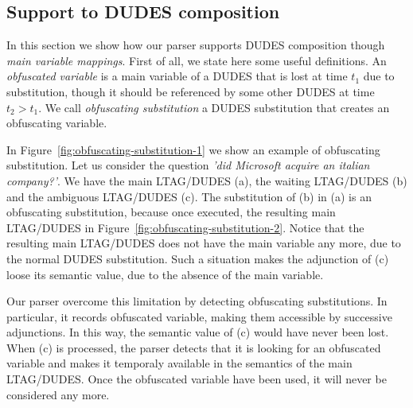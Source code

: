 \subsection{Support to DUDES composition}
\label{sec:parsing-support-dudes-composition}

In this section we show how our parser supports DUDES composition though \textit{main variable mappings}.
%
First of all, we state here some useful definitions.
%
An \textit{obfuscated variable} is a main variable of a DUDES that is lost at time $t_{1}$ due to substitution, though it should be referenced by some other DUDES at time $t_{2}>t_{1}$.
%
We call \textit{obfuscating substitution} a DUDES substitution that creates an obfuscating variable.

In Figure~\ref{fig:obfuscating-substitution-1} we show an example of obfuscating substitution. 
%
Let us consider the question \textit{'did Microsoft acquire an italian company?'}.
%
We have the main LTAG/DUDES (a), the waiting LTAG/DUDES (b) and the ambiguous LTAG/DUDES (c).
%
The substitution of (b) in (a) is an obfuscating substitution, because once executed, the resulting main LTAG/DUDES in Figure~\ref{fig:obfuscating-substitution-2}.
%
Notice that the resulting main LTAG/DUDES does not have the main variable any more, due to the normal DUDES substitution.
%
Such a situation makes the adjunction of (c) loose its semantic value, due to the absence of the main variable.

Our parser overcome this limitation by detecting obfuscating substitutions. 
%
In particular, it records obfuscated variable, making them accessible by successive adjunctions.
%
In this way, the semantic value of (c) would have never been lost.
%
When (c) is processed, the parser detects that it is looking for an obfuscated variable and makes it temporaly available in the semantics of the main LTAG/DUDES.
%
Once the obfuscated variable have been used, it will never be considered any more.

